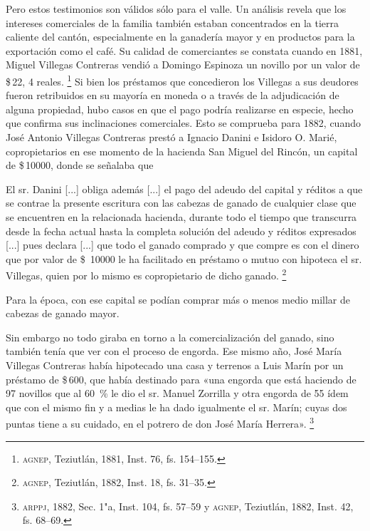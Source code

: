\documentclass[14pt,twoside,final]{extbook} %
\let\oldfootnote\footnote
\renewcommand\footnote[1]{%
\oldfootnote{\hspace{1mm}#1}}
\begin{document}
Pero estos testimonios son válidos sólo para el valle. Un análisis revela que los intereses comerciales de la familia también estaban concentrados en la tierra caliente del cantón, especialmente en la ganadería mayor y en productos para la exportación como el café. Su calidad de comerciantes se constata cuando en 1881, Miguel Villegas Contreras vendió a Domingo Espinoza un novillo por un valor de \$\,22, 4 reales.\footnote{\textsc{agnep}, Teziutlán, 1881, Inst. 76, fs. 154--155.} Si bien los préstamos que concedieron los Villegas a sus deudores fueron retribuidos en su mayoría en moneda o a través de la adjudicación de alguna propiedad, hubo casos en que el pago podría realizarse en especie, hecho que confirma sus inclinaciones comerciales. Esto se comprueba para 1882, cuando José Antonio Villegas Contreras prestó a Ignacio Danini e Isidoro O. Marié, copropietarios en ese momento de la hacienda San Miguel del Rincón, un capital de \$\,10000, donde se señalaba que
\begin{quoting}
El sr. Danini [...] obliga además [...] el pago del adeudo del capital y réditos a que se contrae la presente escritura con las cabezas de ganado de cualquier clase que se encuentren en la relacionada hacienda, durante todo el tiempo que transcurra desde la fecha actual hasta la completa solución del adeudo y réditos expresados [...] pues declara [...] que todo el ganado comprado y que compre es con el dinero que por valor de \$~10000 le ha facilitado en préstamo o mutuo con hipoteca el sr. Villegas, quien por lo mismo es copropietario de dicho ganado.\footnote{\textsc{agnep}, Teziutlán, 1882, Inst. 18, fs. 31--35.}
\end{quoting}
Para la época, con ese capital se podían comprar más o menos medio millar de cabezas de ganado mayor.

Sin embargo no todo giraba en torno a la comercialización del ganado, sino también tenía que ver con el proceso de engorda. Ese mismo año, José María Villegas Contreras había hipotecado una casa y terrenos a Luis Marín por un préstamo de \$\,600, que había destinado para «una engorda que está haciendo de 97 novillos que al 60~\% le dio el sr. Manuel Zorrilla y otra engorda de 55 ídem que con el mismo fin y a medias le ha dado igualmente el sr. Marín; cuyas dos puntas tiene a su cuidado, en el potrero de don José María Herrera».\footnote{\textsc{arppj}, 1882, Sec. 1"a, Inst. 104, fs. 57--59 y \textsc{agnep}, Teziutlán, 1882, Inst. 42, fs. 68--69.}
\end{document}
